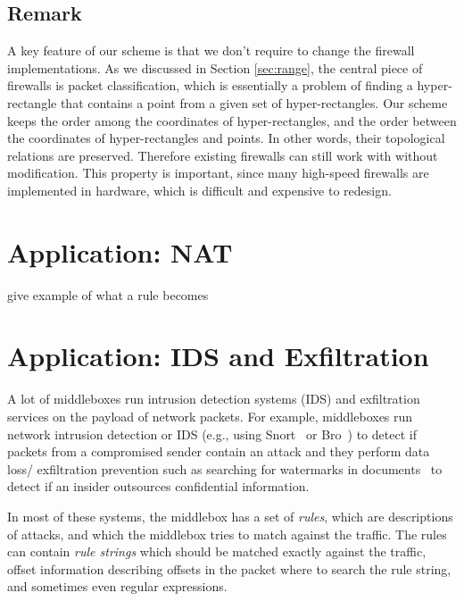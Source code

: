 \subsection{Remark}
A key feature of our scheme is that we don't require to change the firewall implementations. As we discussed in Section \ref{sec:range}, the central 
piece of firewalls is packet classification, which is essentially a problem of finding a hyper-rectangle that contains a point from a given set of hyper-rectangles. Our \RM scheme keeps the order among the coordinates of hyper-rectangles, and the order between the coordinates of hyper-rectangles and points. In other words, their topological relations are preserved. Therefore existing firewalls can still work with \sys without modification. This property is important, since many high-speed firewalls are implemented in hardware, which is difficult and expensive to redesign.

\section{Application: NAT}\label{sec:nat}

give example of what a rule becomes



\section{Application: IDS and Exfiltration}\label{sec:IDS}


A lot of middleboxes run intrusion detection systems (IDS) and exfiltration services on the payload of network packets.
For example, middleboxes run network intrusion detection or IDS (e.g., using  Snort~\cite{Snort} 
or Bro~\cite{Bro}) to detect if packets from a compromised sender contain an attack and they 
perform data loss/ exfiltration prevention such as searching for watermarks in 
documents~\cite{CMU_exfiltration_report} to detect if an insider outsources confidential information.

In most of these systems, the middlebox has a set of {\em rules}, which are descriptions of attacks, and which 
the middlebox tries to match against the traffic. The rules can contain {\em rule strings} which should be matched
exactly against the traffic, offset information describing offsets in the packet where to search the rule string, and
sometimes even regular expressions.

